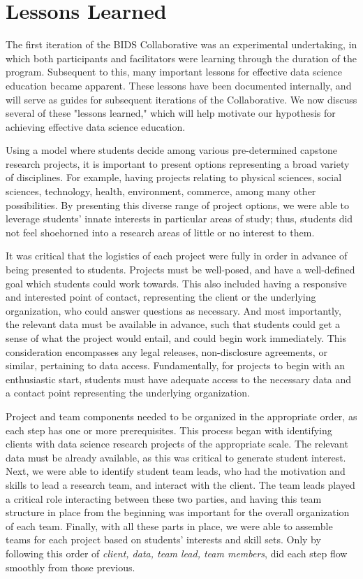 \documentclass{sig-alternate}
\begin{document}
\section{Lessons Learned}

The first iteration of the BIDS Collaborative was an experimental undertaking, in which both participants and facilitators were learning through the duration of the program.  Subsequent to this, many important lessons for effective data science education became apparent.  These lessons have been documented internally, and will serve as guides for subsequent iterations of the Collaborative. We now discuss several of these "lessons learned," which will help motivate our hypothesis for achieving effective data science education.

Using a model where students decide among various pre-determined capstone research projects, it is important to present options representing a broad variety of disciplines.  For example, having projects relating to physical sciences, social sciences, technology, health, environment, commerce, among many other possibilities.  By presenting this diverse range of project options, we were able to leverage students' innate interests in particular areas of study; thus, students did not feel shoehorned into a research areas of little or no interest to them.

It was critical that the logistics of each project were fully in order in advance of being presented to students.  Projects must be well-posed, and have a well-defined goal which students could work towards.  This also included having a responsive and interested point of contact, representing the client or the underlying organization, who could answer questions as necessary.  And most importantly, the relevant data must be available in advance, such that students could get a sense of what the project would entail, and could begin work immediately.  This consideration encompasses any legal releases, non-disclosure agreements, or similar, pertaining to data access.  Fundamentally, for projects to begin with an enthusiastic start, students must have adequate access to the necessary data and a contact point representing the underlying organization.

Project and team components needed to be organized in the appropriate order, as each step has one or more prerequisites.  This process began with identifying clients with data science research projects of the appropriate scale.  The relevant data must be already available, as this was critical to generate student interest.  Next, we were able to identify student team leads, who had the motivation and skills to lead a research team, and interact with the client.  The team leads played a critical role interacting between these two parties, and having this team structure in place from the beginning was important for the overall organization of each team.  Finally, with all these parts in place, we were able to assemble teams for each project based on students' interests and skill sets.  Only by following this order of \emph{client, data, team lead, team members}, did each step flow smoothly from those previous.
\end{document}
